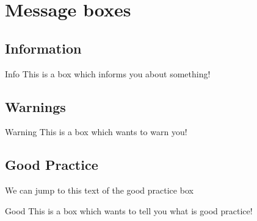 %
%
%
\chapter{Message boxes}



\section{Information}


\begin{boxinfo}{Info}{
 This is a box which informs you about something!}
\end{boxinfo}


\section{Warnings}

\begin{boxwarning}{Warning}{
 This is a box which wants to warn you!}
\end{boxwarning}


\section{Good Practice}\label{box:good_practice}

\hypertarget{htbox:good_practice}{We can jump to this text of the good practice box}
\begin{boxgoodpractice}{Good}{
 This is a box which wants to tell you what is good practice!}
\end{boxgoodpractice}
